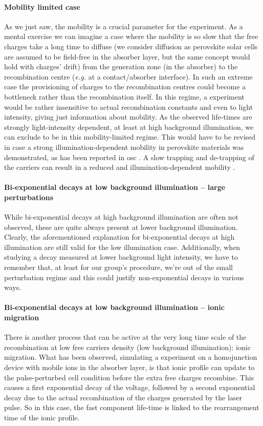 	\paragraph{Mobility limited case}\label{tpv_mobility}
	As we just saw, the mobility is a crucial parameter for the  experiment.
	As a mental exercise we can imagine a case where the mobility is so slow that the free charges take a long time to diffuse (we consider diffusion as perovskite solar cells are assumed to be field-free in the absorber layer, but the same concept would hold with charges' drift) from the generation zone (in the absorber) to the recombination centre (\textit{e.g.} at a contact/absorber interface).
	In such an extreme case the provisioning of charges to the recombination centres could become a bottleneck rather than the recombination itself.
	In this regime, a  experiment would be rather insensitive to actual recombination constants and even to light intensity, giving just information about mobility.
	As the observed  life-times are strongly light-intensity dependent, at least at high background illumination, we can exclude to be in this mobility-limited regime.
	This would have to be revised in case a strong illumination-dependent mobility in perovskite materials was demonstrated, as has been reported in \gls{osc} \cite{Eng2010,Shuttle2010}.
	A slow trapping and de-trapping of the carriers can result in a reduced and illumination-dependent mobility \cite{Du2018}.
	
	\paragraph{Bi-exponential decays at low background illumination -- large perturbations}
	While bi-exponential decays at high background illumination are often not observed, these are quite always present at lower background illumination.
	Clearly, the aforementioned explanation for bi-exponential decays at high illumination are still valid for the low illumination case.
	Additionally, when studying a decay measured at lower background light intensity, we have to remember that, at least for our group's  procedure, we're out of the small perturbation regime and this could justify non-exponential decays in various ways.

	\paragraph{Bi-exponential decays at low background illumination -- ionic migration}
	There is another process that can be active at the very long time scale of the recombination at low free carriers density (low background illumination): ionic migration.
	What has been observed, simulating a  experiment on a homojunction device with mobile ions in the absorber layer, is that ionic profile can update to the pulse-perturbed cell condition before the extra free charges recombine.
	This causes a first exponential decay of the voltage, followed by a second exponential decay due to the actual recombination of the charges generated by the laser pulse.
	So in this case, the fast component life-time is linked to the rearrangement time of the ionic profile.

